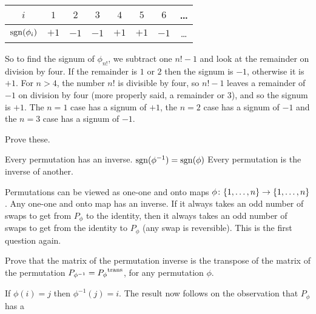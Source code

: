 \begin{exercises}
\begin{answer}
\begin{center}
         \begin{tabular}[b]{c|ccccccc}
           \( i \) &\( 1 \) &\( 2 \) &\( 3 \) &\( 4 \) &\( 5 \)
              &\( 6 \) &\ldots \\
           \hline
           \( \operatorname{sgn}(\phi_i) \) &\( +1 \) &\( -1 \) &\( -1 \) &\( +1 \)
              &\( +1 \) &\( -1 \) &\ldots
         \end{tabular}
      \end{center}  
      So to find the signum of $\phi_{n!}$, we subtract one $n!-1$ and
      look at the remainder on division by four.
      If the remainder is $1$ or $2$ then the signum is $-1$, otherwise it
      is $+1$.
      For $n>4$, the number $n!$ is divisible by four, so $n!-1$ leaves a 
      remainder of $-1$ on division by four (more properly said, a remainder
      or $3$), and so the signum is $+1$.
      The $n=1$ case has a signum of $+1$, the $n=2$ case has a signum of 
      $-1$ and the $n=3$ case has a signum of $-1$.
    \end{answer}
  \item \label{exer:PermInvFacts}
     Prove these.   
     \begin{exparts}
        \partsitem Every permutation has an inverse.
        \partsitem \( \operatorname{sgn}(\phi^{-1})=\operatorname{sgn}(\phi) \)
        \partsitem Every permutation is the inverse of another.
     \end{exparts}
    \begin{answer}
      \begin{exparts}
       \partsitem Permutations can be viewed as one-one and onto maps
         \( \mbox{$\phi\colon \mbox{$\{1,\ldots,n\}$}\to \mbox{$\{1,\ldots,n\}$}$} \).
         Any one-one and onto map has an inverse.
       \partsitem If it always takes an odd number of swaps to get 
         from \( P_\phi \)
         to the identity, then it always takes an odd number of swaps
         to get from the identity to \( P_\phi \) (any swap is reversible).
       \partsitem This is the first question again.
     \end{exparts}  
    \end{answer}
  \item \label{exer:PermInvIffMatTrans}
      Prove that the matrix of the permutation inverse
      is the transpose of the matrix of the permutation 
      $P_{\phi^{-1}}={{P_{\phi}}^{\rm trans}}$, 
      for any permutation $\phi$.
      \begin{answer}
        If $\phi(i)=j$ then $\phi^{-1}(j)=i$.
        The result now follows on the observation that $P_{\phi}$ has a 

\end{answer}
\end{exercises}
